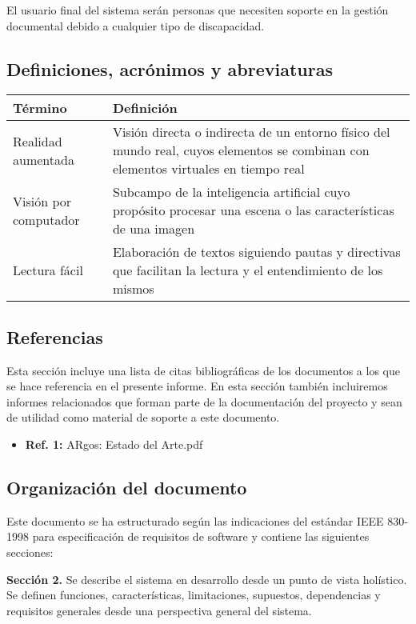 El usuario final del sistema serán personas que necesiten soporte en la gestión documental debido a cualquier tipo de discapacidad.

\subsection{Definiciones, acrónimos y abreviaturas}

\begin{tabular}{|l|p{11cm}|}
  \hline
  \textbf{Término}      & \textbf{Definición} \\ \hline
  Realidad aumentada    & Visión directa o indirecta de un entorno físico del mundo real, cuyos elementos se combinan con elementos virtuales en tiempo real \\ \hline
  Visión por computador & Subcampo de la inteligencia artificial cuyo propósito procesar una escena o las características de una imagen                      \\ \hline
  Lectura fácil         & Elaboración de textos siguiendo pautas y directivas que facilitan la lectura y el entendimiento de los mismos                      \\ \hline
\end{tabular}

\subsection{Referencias}
Esta sección incluye una lista de citas bibliográficas de  los documentos a los que se hace referencia en el presente informe. En esta sección también incluiremos informes relacionados que forman parte de la documentación del proyecto y sean de utilidad como material de soporte a este documento.

\begin{itemize}
  \item \textbf{ Ref. 1:}  ARgos: Estado del Arte.pdf
\end{itemize}

\subsection{Organización del documento}
Este documento se ha estructurado según las indicaciones del estándar IEEE 830-1998 para especificación de requisitos de software y contiene las siguientes secciones:

\textbf{Sección 2.} Se describe el sistema en desarrollo desde un punto de vista holístico. Se definen funciones, características, limitaciones, supuestos, dependencias y requisitos generales desde una perspectiva general del sistema. 


